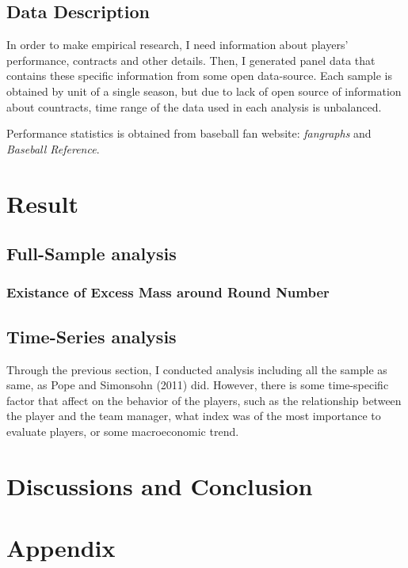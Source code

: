 \documentclass[dvipdfmx, 12pt]{article}
\begin{document}
 \subsection{Data Description}

 In order to make empirical research, I need information
 about players' performance, contracts and other details.
 Then, I generated panel data that contains these specific information
 from some open data-source. Each sample is obtained by unit of a
 single season, but due to lack of open source of information about countracts,
 time range of the data used in each analysis is unbalanced.

 Performance statistics is obtained from baseball fan website:
 \textit{fangraphs} and \textit{Baseball Reference}.





\section{Result}

 \subsection{Full-Sample analysis}
  \subsubsection{Existance of Excess Mass around Round Number}



 \subsection{Time-Series analysis}

 Through the previous section, I conducted analysis including
 all the sample as same, as Pope and Simonsohn (2011) did.
 However, there is some time-specific factor that affect on
 the behavior of the players, such as the relationship
 between the player and the team manager, what index
 was of the most importance to evaluate players, or some
 macroeconomic trend.



\section{Discussions and Conclusion}



\section{Appendix}
\end{document}
